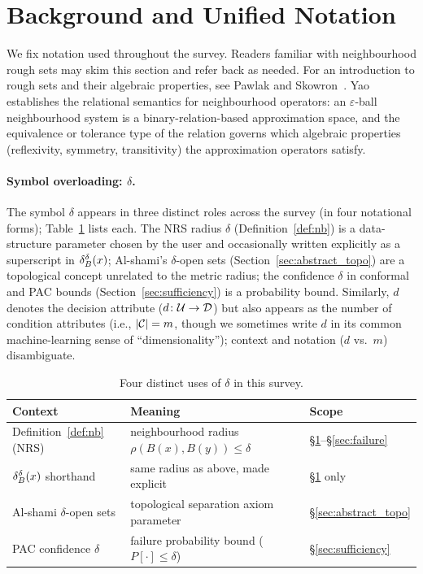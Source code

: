 \section{Background and Unified Notation}
\label{sec:background}

We fix notation used throughout the survey.  Readers familiar with
neighbourhood rough sets may skim this section and refer back as needed.
For an introduction to rough sets and their algebraic properties,
see Pawlak and Skowron~\cite{PawlakSkowron2007rudiments}.  Yao~\cite{Yao1998NRS}
establishes the relational semantics for neighbourhood operators: an
$\varepsilon$-ball neighbourhood system is a binary-relation-based approximation
space, and the equivalence or tolerance type of the relation governs which
algebraic properties (reflexivity, symmetry, transitivity) the approximation
operators satisfy.

\paragraph{Symbol overloading: $\delta$.}
The symbol $\delta$ appears in three distinct roles across the survey
(in four notational forms); Table~\ref{tab:delta_uses} lists each.
The NRS radius $\delta$ (Definition~\ref{def:nb}) is a data-structure
parameter chosen by the user and occasionally written explicitly as a
superscript in $\delta_{B}^\delta(x)$; Al-shami's $\delta$-open sets
(Section~\ref{sec:abstract_topo}) are a topological concept unrelated to
the metric radius; the confidence $\delta$ in conformal and PAC bounds
(Section~\ref{sec:sufficiency}) is a probability bound.
Similarly, $d$ denotes the decision attribute ($d\colon\mathcal{U}\to\mathcal{D}$)
but also appears as the number of condition attributes (i.e., $|\mathcal{C}| = m$,
though we sometimes write $d$ in its common machine-learning sense of
``dimensionality''); context and notation ($d$ vs.\ $m$) disambiguate.

\begin{table}[pos=!htbp]
\caption{Four distinct uses of $\delta$ in this survey.}
\label{tab:delta_uses}
\centering\small
\begin{tabular}{lll}
\toprule
Context & Meaning & Scope \\
\midrule
Definition~\ref{def:nb} (NRS) & neighbourhood radius $\rho(B(x),B(y))\leq\delta$ & §\ref{sec:background}–§\ref{sec:failure} \\
$\delta_{B}^\delta(x)$ shorthand  & same radius as above, made explicit & §\ref{sec:background} only \\
Al-shami $\delta$-open sets   & topological separation axiom parameter & §\ref{sec:abstract_topo} \\
PAC confidence $\delta$        & failure probability bound ($P[\cdot]\leq\delta$) & §\ref{sec:sufficiency} \\
\bottomrule
\end{tabular}
\end{table}

